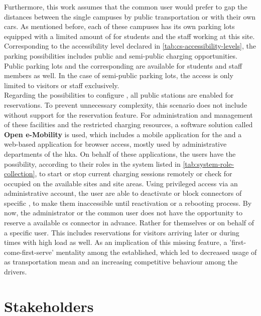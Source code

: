 \noindent Furthermore, this work assumes that the common user would prefer to gap the distances between the single campuses by public transportation or with their own cars.
As mentioned before, each of these campuses has its own parking lots equipped with a limited amount of  for students and the staff working at this site. Corresponding to the accessibility level declared in \ref{tab:cs-accessibility-levels}, the parking possibilities includes public and semi-public charging opportunities.
Public parking lots and the corresponding  are available for students and staff members as well. In the case of semi-public parking lots, the access is only limited to visitors or staff exclusively. \\
Regarding the possibilities to configure , all public stations are enabled for reservations. To prevent unnecessary complexity, this scenario does not include  without support for the reservation feature.
For administration and management of these facilities and the restricted charging resources, a software solution called \textbf{Open e-Mobility} \cite{noauthor_github_nodate,noauthor_github_nodate-1,noauthor_github_nodate-3} is used, which includes a mobile application for the  and a web-based application for browser access, mostly used by administrative departments of the \acrshort{hka}. 
On behalf of these applications, the users have the possibility, according to their roles in the system listed in \ref{tab:system-role-collection}, to start or stop current charging sessions remotely or check for occupied  on the available sites and site areas.
Using privileged access via an administrative account, the user are able to deactivate or block connectors of specific , to make them inaccessible until reactivation or a rebooting process.
By now, the administrator or the common user does not have the opportunity to reserve a available \acrshort{cs} connector in advance. Rather for themselves or on behalf of a specific user. This includes reservations for visitors arriving later or during times with high load as well.
As an implication of this missing feature, a 'first-come-first-serve' mentality among the  established, which led to decreased usage of  as transportation mean and an increasing competitive behaviour among the drivers.

\section{Stakeholders}
\label{ch:Requirements Engineering:sec:Stakeholders}

